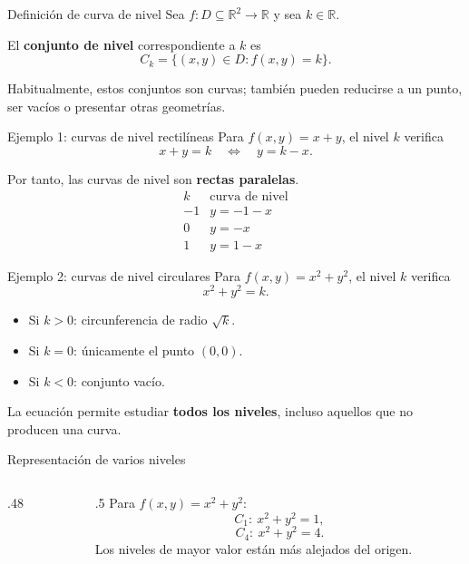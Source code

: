 \documentclass[main.tex]{subfiles}
\begin{document}
\begin{frame}{Definición de curva de nivel}
Sea $f:D\subseteq\mathbb R^2\to\mathbb R$ y sea $k\in\mathbb R$.
\medskip

El \textbf{conjunto de nivel} correspondiente a $k$ es
\[
\boxed{C_k=\{(x,y)\in D:f(x,y)=k\}.}
\]
\medskip

Habitualmente, estos conjuntos son curvas; también pueden reducirse a un punto, ser vacíos o presentar otras geometrías.
\end{frame}

\begin{frame}{Ejemplo 1: curvas de nivel rectilíneas}
Para $f(x,y)=x+y$, el nivel $k$ verifica
\[
x+y=k\quad\Longleftrightarrow\quad y=k-x.
\]
\medskip

Por tanto, las curvas de nivel son \textbf{rectas paralelas}.
\[
\begin{array}{c|c}
k&\text{curva de nivel}\\\hline
-1&y=-1-x\\
0&y=-x\\
1&y=1-x
\end{array}
\]
\end{frame}

\begin{frame}{Ejemplo 2: curvas de nivel circulares}
Para $f(x,y)=x^2+y^2$, el nivel $k$ verifica
\[
x^2+y^2=k.
\]
\begin{itemize}
  \item Si $k>0$: circunferencia de radio $\sqrt{k}$.
  \item Si $k=0$: únicamente el punto $(0,0)$.
  \item Si $k<0$: conjunto vacío.
\end{itemize}
\medskip

La ecuación permite estudiar \textbf{todos los niveles}, incluso aquellos que no producen una curva.
\end{frame}

\begin{frame}{Representación de varios niveles}
\begin{columns}[c]
  \begin{column}{.48\textwidth}
    \centering
  \end{column}
  \begin{column}{.5\textwidth}
    Para $f(x,y)=x^2+y^2$:
    \[
    C_1:\ x^2+y^2=1,
    \]
    \[
    C_4:\ x^2+y^2=4.
    \]
    Los niveles de mayor valor están más alejados del origen.
  \end{column}
\end{columns}
\end{frame}
\end{document}
